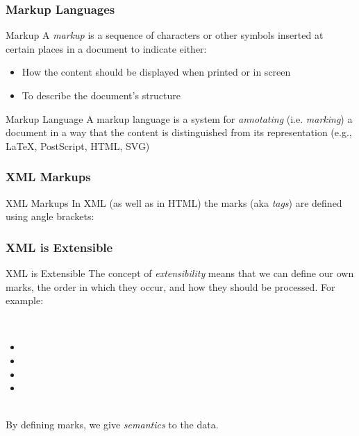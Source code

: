\documentclass[svgnames]{beamer}
\begin{document}

\begin{frame}
\frametitle{Markup Languages}

\begin{block}{Markup}
A \emph{markup} is a sequence of characters or other symbols inserted at certain places in a document to indicate either: 
\begin{itemize}
 \item How the content should be displayed when printed or in screen
 \item To describe the document's structure
\end{itemize}
\end{block}

\begin{block}{Markup Language}
A markup language is a system for \emph{annotating} (i.e. \textit{marking}) a document in a way that the content is distinguished from its representation (e.g., LaTeX, PostScript, HTML, SVG)
\end{block}

\end{frame}


\begin{frame}[fragile]
\frametitle{XML Markups}

\begin{block}{XML Markups}
In XML (as well as in HTML) the marks (aka \textit{tags}) are defined using angle brackets: {\Large {\hilit \code{<>}}}
\end{block}

\bigskip


\end{frame}


\begin{frame}[fragile]
\frametitle{XML is Extensible}

\begin{block}{XML is Extensible}
The concept of \textit{extensibility} means that we can define our own marks, the order in which they occur, and how they should be processed. For example:

~\\

 \begin{itemize}
  \item {}
  \item {}
  \item {}
  \item {}
 \end{itemize}
~\\

By defining marks, we give \emph{semantics} to the data.
\end{block}

\end{frame}
\end{document}
